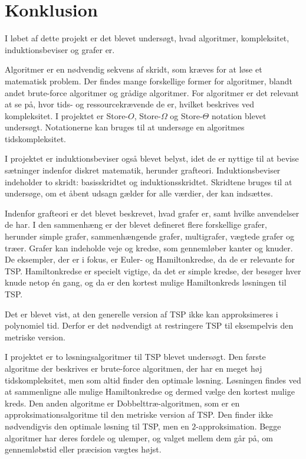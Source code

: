 \chapter{Konklusion}


I løbet af dette projekt er det blevet undersøgt, hvad algoritmer, kompleksitet, induktionsbeviser og grafer er.
 
Algoritmer er en nødvendig sekvens af skridt, som kræves for at løse et matematisk problem. 
Der findes mange forskellige former for algoritmer, blandt andet brute-force algoritmer og grådige algoritmer. 
For algoritmer er det relevant at se på, hvor tids- og ressourcekrævende de er, hvilket beskrives ved kompleksitet. 
I projektet er Store-$O$, Store-$\Omega$ og Store-$\Theta$ notation blevet undersøgt. 
Notationerne kan bruges til at undersøge en algoritmes tidskompleksitet.
 
I projektet er induktionsbeviser også blevet belyst, idet de er nyttige til at bevise sætninger indenfor diskret matematik, herunder grafteori. 
Induktionsbeviser indeholder to skridt: basisskridtet og induktionsskridtet.
Skridtene bruges til at undersøge, om et åbent udsagn gælder for alle værdier, der kan indsættes. 

Indenfor grafteori er det blevet beskrevet, hvad grafer er, samt hvilke anvendelser de har. 
I den sammenhæng er der blevet defineret flere forskellige grafer, herunder  simple grafer, sammenhængende grafer, multigrafer, vægtede grafer og træer. 
Grafer kan indeholde veje og kredse, som gennemløber kanter og knuder. 
De eksempler, der er i fokus, er Euler- og Hamiltonkredse, da de er relevante for TSP. 
Hamiltonkredse er specielt vigtige, da det er simple kredse, der besøger hver knude netop én gang, og da er den kortest mulige Hamiltonkreds løsningen til TSP. 

Det er blevet vist, at den generelle version af TSP ikke kan approksimeres i polynomiel tid. Derfor er det nødvendigt at restringere TSP til eksempelvis den metriske version.

I projektet er to løsningsalgoritmer til TSP blevet undersøgt. 
Den første algoritme der beskrives er brute-force algoritmen, der har en meget høj tidskompleksitet, men som altid finder den optimale løsning. 
Løsningen findes ved at sammenligne alle mulige Hamiltonkredse og dermed vælge den kortest mulige kreds.  
Den anden algoritme er Dobbelttræ-algoritmen, som er en approksimationsalgoritme til den metriske version af TSP. 
Den finder ikke nødvendigvis den optimale løsning til TSP, men en $2$-approksimation. 
Begge algoritmer har deres fordele og ulemper, og valget mellem dem går på, om gennemløbstid eller præcision vægtes højst. 